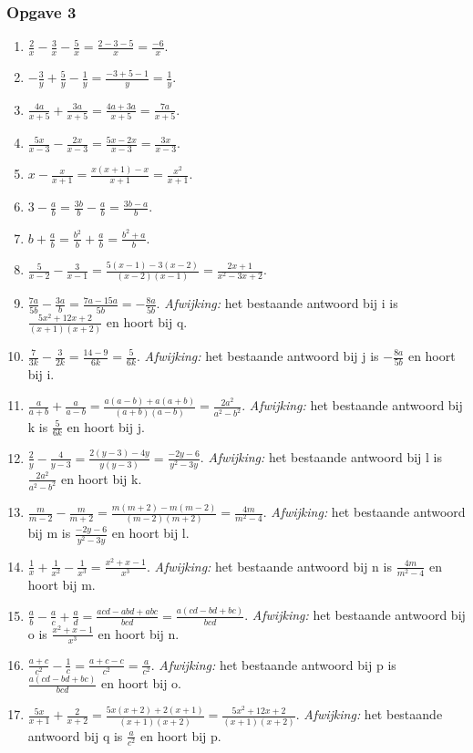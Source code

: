 \subsubsection*{Opgave 3}
\begin{enumerate}[label=\alph*)]
\item $\frac{2}{x}-\frac{3}{x}-\frac{5}{x}=\frac{2-3-5}{x}=\frac{-6}{x}$.
\item $-\frac{3}{y}+\frac{5}{y}-\frac{1}{y}=\frac{-3+5-1}{y}=\frac{1}{y}$.
\item $\frac{4a}{x+5}+\frac{3a}{x+5}=\frac{4a+3a}{x+5}=\frac{7a}{x+5}$.
\item $\frac{5x}{x-3}-\frac{2x}{x-3}=\frac{5x-2x}{x-3}=\frac{3x}{x-3}$.
\item $x-\frac{x}{x+1}=\frac{x(x+1)-x}{x+1}=\frac{x^2}{x+1}$.
\item $3-\frac{a}{b}=\frac{3b}{b}-\frac{a}{b}=\frac{3b-a}{b}$.
\item $b+\frac{a}{b}=\frac{b^2}{b}+\frac{a}{b}=\frac{b^2+a}{b}$.
\item $\frac{5}{x-2}-\frac{3}{x-1}=\frac{5(x-1)-3(x-2)}{(x-2)(x-1)}=\frac{2x+1}{x^2-3x+2}$.
\item $\frac{7a}{5b}-\frac{3a}{b}=\frac{7a-15a}{5b}=-\frac{8a}{5b}$. \emph{Afwijking:} het bestaande antwoord bij i is $\frac{5x^2+12x+2}{(x+1)(x+2)}$ en hoort bij q.
\item $\frac{7}{3k}-\frac{3}{2k}=\frac{14-9}{6k}=\frac{5}{6k}$. \emph{Afwijking:} het bestaande antwoord bij j is $-\frac{8a}{5b}$ en hoort bij i.
\item $\frac{a}{a+b}+\frac{a}{a-b}=\frac{a(a-b)+a(a+b)}{(a+b)(a-b)}=\frac{2a^2}{a^2-b^2}$. \emph{Afwijking:} het bestaande antwoord bij k is $\frac{5}{6k}$ en hoort bij j.
\item $\frac{2}{y}-\frac{4}{y-3}=\frac{2(y-3)-4y}{y(y-3)}=\frac{-2y-6}{y^2-3y}$. \emph{Afwijking:} het bestaande antwoord bij l is $\frac{2a^2}{a^2-b^2}$ en hoort bij k.
\item $\frac{m}{m-2}-\frac{m}{m+2}=\frac{m(m+2)-m(m-2)}{(m-2)(m+2)}=\frac{4m}{m^2-4}$. \emph{Afwijking:} het bestaande antwoord bij m is $\frac{-2y-6}{y^2-3y}$ en hoort bij l.
\item $\frac{1}{x}+\frac{1}{x^2}-\frac{1}{x^3}=\frac{x^2+x-1}{x^3}$. \emph{Afwijking:} het bestaande antwoord bij n is $\frac{4m}{m^2-4}$ en hoort bij m.
\item $\frac{a}{b}-\frac{a}{c}+\frac{a}{d}=\frac{acd-abd+abc}{bcd}=\frac{a(cd-bd+bc)}{bcd}$. \emph{Afwijking:} het bestaande antwoord bij o is $\frac{x^2+x-1}{x^3}$ en hoort bij n.
\item $\frac{a+c}{c^2}-\frac{1}{c}=\frac{a+c-c}{c^2}=\frac{a}{c^2}$. \emph{Afwijking:} het bestaande antwoord bij p is $\frac{a(cd-bd+bc)}{bcd}$ en hoort bij o.
\item $\frac{5x}{x+1}+\frac{2}{x+2}=\frac{5x(x+2)+2(x+1)}{(x+1)(x+2)}=\frac{5x^2+12x+2}{(x+1)(x+2)}$. \emph{Afwijking:} het bestaande antwoord bij q is $\frac{a}{c^2}$ en hoort bij p.
\end{enumerate}

